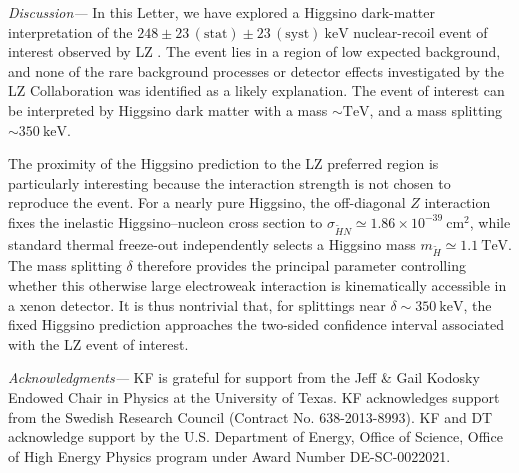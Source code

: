 \documentclass[
aps,
prl,
reprint,
superscriptaddress,
nofootinbib,
nobibnotes
]{revtex4-2}
\begin{document}
 


\textit{Discussion---}
In this Letter, we have explored a Higgsino dark-matter interpretation of the $248\pm23\,(\mathrm{stat})\pm23\,(\mathrm{syst})~\mathrm{keV}$ nuclear-recoil event of interest observed by LZ \cite{LZ:2026}. The event lies in a region of low expected background, and none of the rare background processes or detector effects investigated by the LZ Collaboration was identified as a likely explanation.
The event of interest can be interpreted by Higgsino dark matter with a mass $\sim\mathrm{TeV}$, and a mass splitting $\sim350~\mathrm{keV}$.

The proximity of the Higgsino prediction to the LZ preferred region is particularly interesting because the interaction strength is not chosen to reproduce the event.
For a nearly pure Higgsino, the off-diagonal $Z$ interaction fixes the inelastic Higgsino--nucleon cross section to $\sigma_{\widetilde H N}\simeq1.86\times10^{-39}~\mathrm{cm}^2$, while standard thermal freeze-out independently selects a Higgsino mass $m_{\widetilde H}\simeq1.1~\mathrm{TeV}$. The mass splitting $\delta$ therefore provides the principal parameter controlling whether this otherwise large electroweak interaction is kinematically accessible in a xenon detector.
It is thus nontrivial that, for splittings near $\delta\sim350~\mathrm{keV}$, the fixed Higgsino prediction approaches the two-sided confidence interval associated with the LZ event of interest.

\textit{Acknowledgments---}
KF is grateful for support from the Jeff \& Gail Kodosky Endowed Chair in Physics at the University of Texas. KF acknowledges support from the Swedish Research Council (Contract No. 638-2013-8993).  KF and DT acknowledge support by the U.S. Department of Energy, Office of Science, Office of High Energy Physics program under Award Number DE-SC-0022021.





\end{document}
